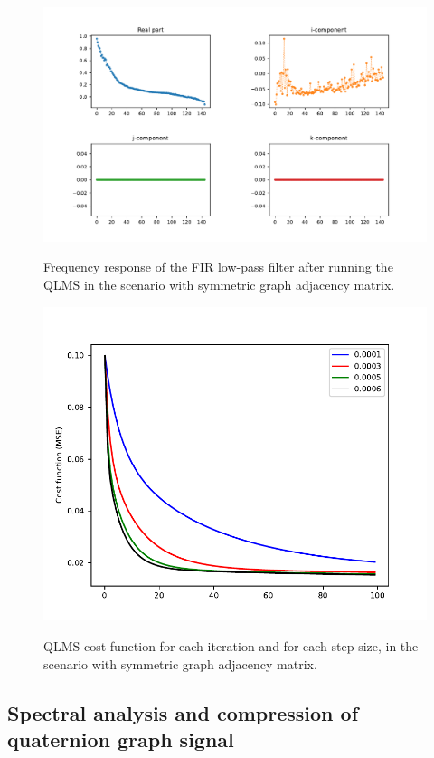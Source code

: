 \begin{figure}
    \centering
    \caption{Frequency response of the FIR low-pass filter after running the QLMS in the scenario with symmetric graph adjacency matrix.}
    \includegraphics[width=\linewidth]{Figures/uk_example/uk_qlm_filter_symmetric.pdf}
    \floatsource
    \label{fig:uk_qlm_filter_symmetric}
\end{figure}
\renewcommand{\floatpagefraction}{.9}%
\begin{figure}
    \centering
    \caption{QLMS cost function for each iteration and for each step size, in the scenario with symmetric graph adjacency matrix.}
    \includegraphics[width=0.58\linewidth]{Figures/uk_example/uk_qlms_iterations_symmetric.pdf}
    \floatsource
    \label{fig:uk_qlms_iterations_symmetric}
\end{figure}

\subsection{Spectral analysis and compression of quaternion graph signal}


